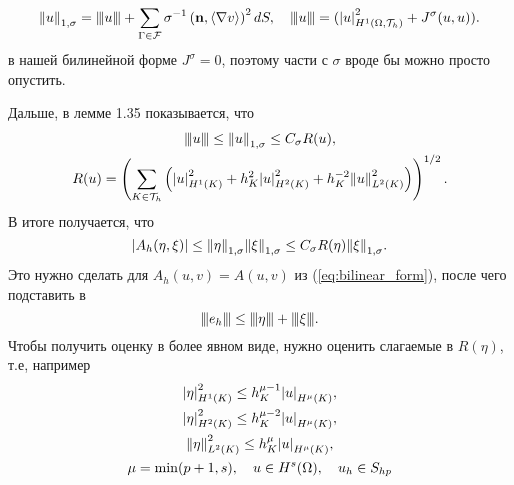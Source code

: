 \documentclass[a4paper,12pt, russian, titlepage]{article} %
\numberwithin{equation}{section}
\renewcommand{\vec}[1]{\mathbf{#1}}
\newcommand{\xmod}[1]{{\left\vert\kern-0.25ex\left\vert\kern-0.25ex\left\vert #1 
    \right\vert\kern-0.25ex\right\vert\kern-0.25ex\right\vert}}
\numberwithin{theorem}{subsection}
\numberwithin{definition}{subsection}
\numberwithin{proposition}{subsection}
\begin{document}
\begin{equation}
\norm{u}_{1, \sigma} = \xmod{u} + \sum_{\Gamma \in \mathcal{F}} \sigma^{-1} \left(\vec{n}, \langle\nabla v \rangle\right)^2 dS, \quad
 \xmod{u} = (\abs{u}^2_{H^1(\Omega, \mathcal{T}_h)} + J^\sigma(u, u)).
\end{equation}
в нашей билинейной форме $J^\sigma = 0$, поэтому части с $\sigma$ вроде бы можно просто опустить. \par
Дальше, в лемме 1.35 показывается, что
\begin{gather}
\xmod{u} \le \norm{u}_{1, \sigma} \le C_{\sigma} R(u), \\
R(u) = \left(\sum_{K \in \mathcal{T}_h} \left(\abs{u}_{H^1(K)}^2 + h^2_K \abs{u}_{H^2(K)}^2 + h^{-2}_K \norm{u}_{L^2(K)}^2\right) \right)^{1/2}.
\end{gather}
В итоге получается, что 
\begin{equation}
\abs{A_h(\eta, \xi)} \le \norm{\eta}_{1, \sigma} \norm{\xi}_{1, \sigma} \le C_{\sigma} R(\eta) \norm{\xi}_{1, \sigma}.
\end{equation}
Это нужно сделать для $A_h(u, v) = A(u, v)$ из (\ref{eq:bilinear_form}), после чего подставить в 
\begin{equation}
\xmod{e_h} \le \xmod{\eta} + \xmod{\xi}.
\end{equation}
Чтобы получить оценку в более явном виде, нужно оценить слагаемые в $R(\eta)$, т.е, например
\begin{gather}
\abs{\eta}_{H^1(K)}^2 \le h^{\mu - 1}_K \abs{u}_{H^\mu(K)}, \\
\abs{\eta}_{H^2(K)}^2 \le h^{\mu - 2}_K \abs{u}_{H^\mu(K)}, \\
\norm{\eta}_{L^2(K)}^2 \le h^{\mu}_K \abs{u}_{H^\mu(K)}, \\
\mu = \min(p + 1, s), \quad u \in H^s(\Omega), \quad u_h \in S_{hp}
\end{gather}
\end{document}
